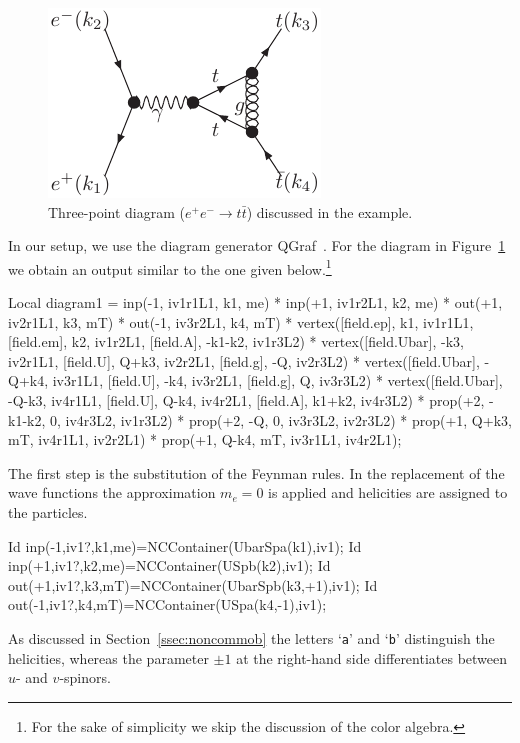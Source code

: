 \documentclass[preprint,number,12pt,sort&compress]{elsarticle}
\begin{document}
\begin{figure}[tbph]
\begin{center}
\includegraphics{pyxovirt}
\end{center}
\caption{Three-point diagram ($e^+e^-\rightarrow t\bar{t}$)
   discussed in the example.}
\label{fig:pyxovirt}
\end{figure}
In our setup, we use the diagram generator QGraf~\cite{Nogueira:1991ex}.
For the diagram in Figure~\ref{fig:pyxovirt} we obtain an output similar
to the one given below.\footnote{For the sake of simplicity we skip the
discussion of the color algebra.}
\begin{form}
Local diagram1 =
   inp(-1, iv1r1L1, k1, me) *
   inp(+1, iv1r2L1, k2, me) *
   out(+1, iv2r1L1, k3, mT) *
   out(-1, iv3r2L1, k4, mT) *
   vertex([field.ep], k1, iv1r1L1,
          [field.em], k2, iv1r2L1,
          [field.A], -k1-k2, iv1r3L2) *
   vertex([field.Ubar], -k3, iv2r1L1,
          [field.U], Q+k3, iv2r2L1,
          [field.g], -Q, iv2r3L2) *
   vertex([field.Ubar], -Q+k4, iv3r1L1,
          [field.U], -k4, iv3r2L1,
          [field.g], Q, iv3r3L2) *
   vertex([field.Ubar], -Q-k3, iv4r1L1,
          [field.U], Q-k4, iv4r2L1,
          [field.A], k1+k2, iv4r3L2) *
   prop(+2, -k1-k2, 0, iv4r3L2, iv1r3L2) *
   prop(+2, -Q, 0, iv3r3L2, iv2r3L2) *
   prop(+1, Q+k3, mT, iv4r1L1, iv2r2L1) *
   prop(+1, Q-k4, mT, iv3r1L1, iv4r2L1);
\end{form}

The first step is the substitution of the Feynman rules.
In the replacement of the wave functions the approximation $m_e=0$
is applied and helicities are assigned to the particles.
\begin{spform}
Id inp(-1,iv1?,k1,me)=NCContainer(UbarSpa(k1),iv1);
Id inp(+1,iv1?,k2,me)=NCContainer(USpb(k2),iv1);
Id out(+1,iv1?,k3,mT)=NCContainer(UbarSpb(k3,+1),iv1);
Id out(-1,iv1?,k4,mT)=NCContainer(USpa(k4,-1),iv1);
\end{spform}
As discussed in Section~\ref{ssec:noncommob} the letters `\texttt{a}'
and `\texttt{b}' distinguish the helicities, whereas the parameter $\pm1$
at the right-hand side differentiates between $u$- and $v$-spinors.
\end{document}
